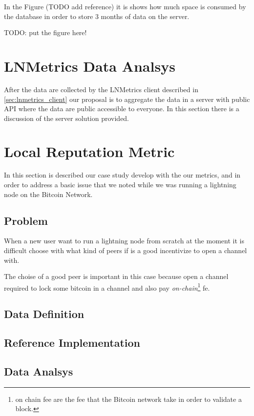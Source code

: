 In the Figure (TODO add reference) it is shows how much space is 
consumed by the database in order to store 3 months of data on the server. 

TODO: put the figure here!

\section{LNMetrics Data Analsys}
\label{sec:lnmetrics_server}

After the data are collected by the LNMetrics client described in \ref{sec:lnmetrics_client}
our proposal is to aggregate the data in a server with public API where the data are 
public accessible to everyone. In this section there is a discussion of 
the server solution provided.

\section{Local Reputation Metric}

In this section is described our case study develop with the our metrics, and
in order to address a basic issue that we noted while we was running a lightning
node on the Bitcoin Network. 

\subsection{Problem}

When a new user want to run a lightning node from scratch at the moment it is 
difficult choose with what kind of peers if is a good incentivize to open a channel with. 

The choise of a good peer is important in this case because open a channel 
required to lock some bitcoin in a channel and also pay \emph{on-chain}\footnote{on chain fee are the fee that the Bitcoin network take in order to validate a block.} 
fe.

\subsection{Data Definition}


\subsection{Reference Implementation}


\subsection{Data Analsys}

